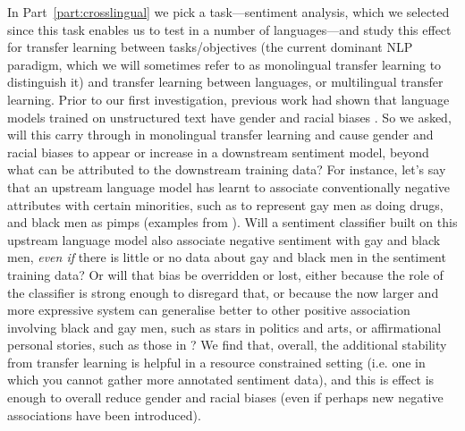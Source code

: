 In Part~\ref{part:crosslingual} we pick a task---sentiment analysis, which we selected since this task enables us to test in a number of languages---and study this effect for transfer learning between tasks/objectives (the current dominant NLP paradigm, which we will sometimes refer to as monolingual transfer learning to distinguish it) and transfer learning between languages, or multilingual transfer learning. Prior to our first investigation, previous work had shown that language models trained on unstructured text have gender and racial biases \cite{bolukbasi, caliskan, zhao-etal-2019-gender, https://aclanthology.org/2020.acl-main.260, sheng-etal-2019-woman}. So we asked, will this carry through in monolingual transfer learning and cause gender and racial biases to appear or increase in a downstream sentiment model, beyond what can be attributed to the downstream training data? For instance, let's say that an upstream language model has learnt to associate conventionally negative attributes with certain minorities, such as to represent gay men as doing drugs, and black men as pimps (examples from \citet{sheng-etal-2019-woman}). Will a sentiment classifier built on this upstream language model also associate negative sentiment with gay and black men, \textit{even if} there is little or no data about gay and black men in the sentiment training data? 
Or will that bias be overridden or lost, either because the role of the classifier is strong enough to disregard that, or because the now larger and more expressive system can generalise better to other positive association involving black and gay men, such as stars in politics and arts, or affirmational personal stories, such as those in \cite{Dixon2018MeasuringAM}? We find that, overall, the additional stability from transfer learning is helpful in a resource constrained setting (i.e. one in which you cannot gather more annotated sentiment data), and this is effect is enough to overall reduce gender and racial biases (even if perhaps new negative associations have been introduced).

